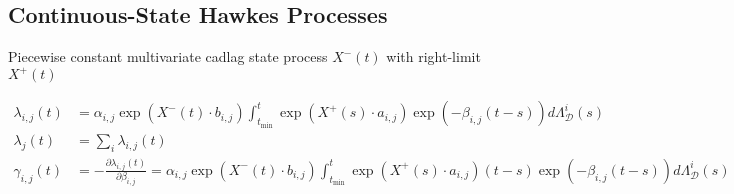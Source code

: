 \documentclass[honours,12pt]{unswthesis}
\numberwithin{equation}{section}
\begin{document}
\subsection{Continuous-State Hawkes Processes}

Piecewise constant multivariate cadlag state process $X^-(t)$ with right-limit $X^+(t)$

\begin{equation*}
	\begin{align}
		\lambda_{i,j}(t) &= \alpha_{i,j} \exp(X^-(t)\cdot b_{i,j})\int_{t_\mathrm{min}}^t \exp(X^+(s)\cdot a_{i,j}) \exp(-\beta_{i,j}(t-s)) d\Lambda_\mathcal{D}^i(s) \\
		\lambda_j(t) &= \sum_i \lambda_{i,j}(t) \\
		\gamma_{i,j}(t) &= -\frac{\partial\lambda_{i,j}(t)}{\partial\beta_{i,j}} = \alpha_{i,j} \exp(X^-(t)\cdot b_{i,j})\int_{t_\mathrm{min}}^t \exp(X^+(s)\cdot a_{i,j}) (t-s)\exp(-\beta_{i,j}(t-s)) d\Lambda_\mathcal{D}^i(s) \\
	\end{align}
\end{equation*}
\end{document}
